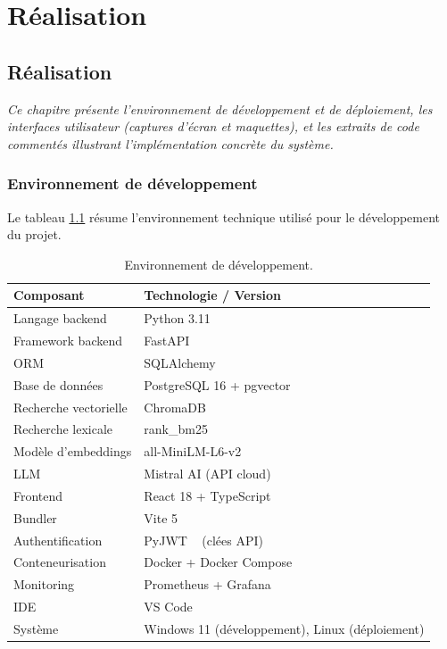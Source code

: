 \documentclass[12pt,a4paper,oneside]{report}
\newcommand{\chaptercolor}{mainblue}
\newcommand{\setchaptercolor}[1]{\renewcommand{\chaptercolor}{#1}}
\newcommand{\chapterabstract}[1]{\vspace{-0.5cm}\begin{center}\begin{minipage}{0.9\textwidth}\small\itshape\textcolor{\chaptercolor!70!black}{#1}\end{minipage}\end{center}\vspace{0.5cm}}
\begin{document}

\part{R\'{e}alisation}

\setchaptercolor{mainblue}

\chapter{R\'{e}alisation}

\chapterabstract{Ce chapitre pr\'{e}sente l'environnement de d\'{e}veloppement et de d\'{e}ploiement, les interfaces utilisateur (captures d'\'{e}cran et maquettes), et les extraits de code comment\'{e}s illustrant l'impl\'{e}mentation concr\`{e}te du syst\`{e}me.}

\section{Environnement de d\'{e}veloppement}

Le tableau \ref{tab:stack_developpement} r\'{e}sume l'environnement technique utilis\'{e} pour le d\'{e}veloppement du projet.

\begin{table}[htbp]\centering
\begin{tabular}{@{}ll@{}}
\toprule
\textbf{Composant} & \textbf{Technologie / Version} \\
\midrule
Langage backend & Python 3.11 \\
Framework backend & FastAPI ~\cite{fastapi} \\
ORM & SQLAlchemy ~\cite{sqlalchemy} \\
Base de donn\'{e}es & PostgreSQL 16 + pgvector \\
Recherche vectorielle & ChromaDB ~\cite{chromadb} \\
Recherche lexicale & rank\_bm25 ~\cite{rank_bm25} \\
Mod\`{e}le d'embeddings & all-MiniLM-L6-v2 ~\cite{minilm} \\
LLM & Mistral AI (API cloud) \\
Frontend & React 18 + TypeScript ~\cite{react} \\
Bundler & Vite 5 \\
Authentification & PyJWT ~\cite{pyjwt} (cl\'{e}es API) \\
Conteneurisation & Docker + Docker Compose \\
Monitoring & Prometheus + Grafana \\
IDE & VS Code \\
Syst\`{e}me & Windows 11 (d\'{e}veloppement), Linux (d\'{e}ploiement) \\
\bottomrule
\end{tabular}
\caption{Environnement de d\'{e}veloppement.}
\label{tab:stack_developpement}
\end{table}
\end{document}
